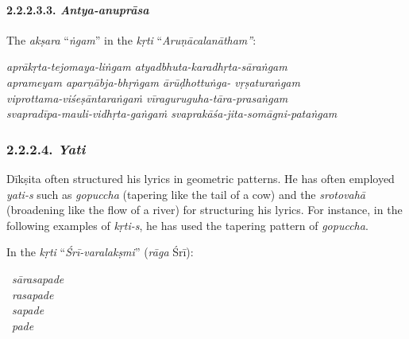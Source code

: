 \vspace{-.4cm}

\paragraph*{2.2.2.3.3. \textit{Antya-anuprāsa}}

\vspace{-.3cm}

The \textit{akṣara} “\textit{ṅgam}” in the \textit{kṛti} “\textit{Aruṇācalanātham”}:

\begin{myquote}
\textit{aprākṛta-tejomaya-liṅgam atyadbhuta-karadhṛta-sāraṅgam}\\ \textit{aprameyam aparṇābja-bhṛṅgam ārūḍhottuṅga- vṛṣaturaṅgam}\\ \textit{viprottama-viśeṣāntaraṅgaṁ vīraguruguha-tāra-prasaṅgam}\\ \textit{svapradīpa-mauli-vidhṛta-gaṅgaṁ svaprakāśa-jita-somāgni-pataṅgam}
\end{myquote}

\vspace{-.3cm}

\subsubsection*{2.2.2.4. \textit{Yati}}

\vspace{-.2cm}

Dīkṣita often structured his lyrics in geometric patterns. He has often employed \textit{yati-s} such as \textit{gopuccha} (tapering like the tail of a cow) and the \textit{srotovahā} (broadening like the flow of a river) for structuring his lyrics. For instance, in the following examples of \textit{kṛti-s}, he has used the tapering pattern of \textit{gopuccha}.



In the \textit{kṛti} “\textit{Śrī-varalakṣmi}” (\textit{rāga} Śrī):

\vspace{-.45cm}

\begin{myquoteplus}
\begin{center}
~\hspace{.2cm}\textit{sārasapade}\\ 
~\hspace{.42cm}\textit{rasapade}\\ 
~\hspace{.65cm}\textit{sapade}\\ 
~\hspace{.9cm}\textit{pade}
\end{center}
\end{myquoteplus}

